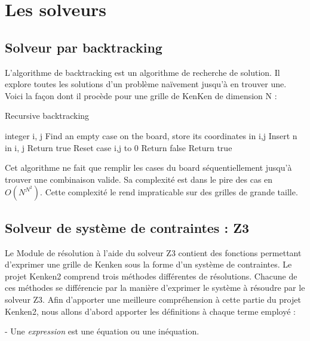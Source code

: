 \documentclass[1]{report}
\begin{document}
\chapter{Les solveurs}

\section{Solveur par backtracking}

L'algorithme de backtracking est un algorithme de recherche de solution. Il explore toutes les solutions d'un problème naïvement jusqu'à en trouver une. Voici la façon dont il procède pour une grille de KenKen de dimension N :\\

\begin{algorithm}
\caption{Recursive backtracking}
\begin{algorithmic}[1]
\STATE integer i, j
\STATE Find an empty case on the board, store its coordinates in i,j
\STATE Insert n in i, j
\STATE Return true
\ELSE
\STATE Reset case i,j to 0 
\ENDIF
\ENDIF
\ENDFOR
\STATE Return false
\ELSE
\STATE Return true
\ENDIF

\end{algorithmic}
\end{algorithm}

Cet algorithme ne fait que remplir les cases du board séquentiellement jusqu'à trouver une combinaison valide. Sa complexité est dans le pire des cas en \textit{$O(N^{N^2})$}. Cette complexité le rend impraticable sur des grilles de grande taille.

\section{Solveur de système de contraintes : Z3}

    Le Module de résolution à l'aide du solveur Z3 contient des fonctions permettant d'exprimer une grille de Kenken sous la forme d'un système de contraintes. Le projet Kenken2 comprend trois méthodes différentes de résolutions. Chacune de ces méthodes se différencie par la manière d'exprimer le système à résoudre par le solveur Z3. Afin d'apporter une meilleure compréhension à cette partie du projet Kenken2, nous allons d'abord apporter les définitions à chaque terme employé : \newline
    
    - Une \textit{expression} est une équation ou une inéquation.
    
\end{document}
